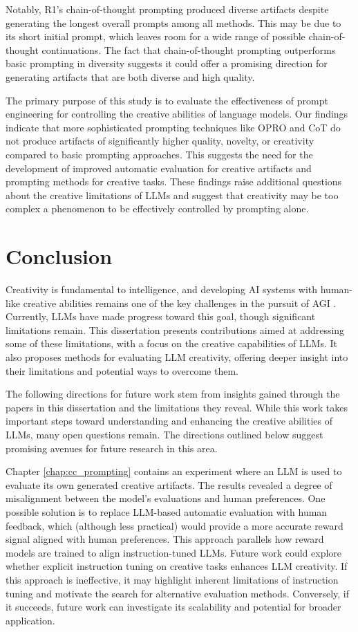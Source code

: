 \documentclass[phd,electronic,oneside,twosidetoc,letterpaper,chaptercenter,parttop,lof]{byumsphd}
\begin{document}
Notably, R1's chain-of-thought prompting produced diverse artifacts despite generating the longest overall prompts among all methods. This may be due to its short initial prompt, which leaves room for a wide range of possible chain-of-thought continuations. The fact that chain-of-thought prompting outperforms basic prompting in diversity suggests it could offer a promising direction for generating artifacts that are both diverse and high quality.

The primary purpose of this study is to evaluate the effectiveness of prompt engineering for controlling the creative abilities of language models. Our findings indicate that more sophisticated prompting techniques like OPRO and CoT do not produce artifacts of significantly higher quality, novelty, or creativity compared to basic prompting approaches. This suggests the need for the development of improved automatic evaluation for creative artifacts and prompting methods for creative tasks. These findings raise additional questions about the creative limitations of LLMs and suggest that creativity may be too complex a phenomenon to be effectively controlled by prompting alone.

\chapter{Conclusion}
\label{chap:conclusion}

Creativity is fundamental to intelligence, and developing AI systems with human-like creative abilities remains one of the key challenges in the pursuit of AGI \cite{Morris2023PositionLO}.
Currently, LLMs have made progress toward this goal, though significant limitations remain. 
This dissertation presents contributions aimed at addressing some of these limitations, with a focus on the creative capabilities of LLMs.
It also proposes methods for evaluating LLM creativity, offering deeper insight into their limitations and potential ways to overcome them.

The following directions for future work stem from insights gained through the papers in this dissertation and the limitations they reveal. 
While this work takes important steps toward understanding and enhancing the creative abilities of LLMs, many open questions remain. 
The directions outlined below suggest promising avenues for future research in this area.

Chapter \ref{chap:cc_prompting} contains an experiment where an LLM is used to evaluate its own generated creative artifacts. 
The results revealed a degree of misalignment between the model's evaluations and human preferences. 
One possible solution is to replace LLM-based automatic evaluation with human feedback, which (although less practical) would provide a more accurate reward signal aligned with human preferences. 
This approach parallels how reward models are trained to align instruction-tuned LLMs. 
Future work could explore whether explicit instruction tuning on creative tasks enhances LLM creativity. 
If this approach is ineffective, it may highlight inherent limitations of instruction tuning and motivate the search for alternative evaluation methods. 
Conversely, if it succeeds, future work can investigate its scalability and potential for broader application.
\end{document}
